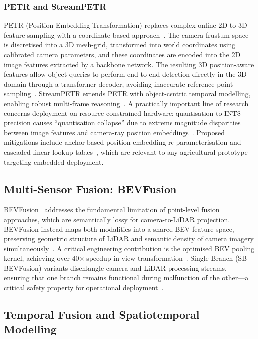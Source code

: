 \documentclass[12pt, a4paper]{article}
\begin{document}
\subsubsection{PETR and StreamPETR}

PETR (Position Embedding Transformation) replaces complex online 2D-to-3D feature
sampling with a coordinate-based approach~\cite{ref66, ref67}. The camera frustum space is
discretised into a 3D mesh-grid, transformed into world coordinates using calibrated
camera parameters, and these coordinates are encoded into the 2D image features extracted
by a backbone network. The resulting 3D position-aware features allow object queries to
perform end-to-end detection directly in the 3D domain through a transformer decoder,
avoiding inaccurate reference-point sampling~\cite{ref67}. StreamPETR extends PETR with
object-centric temporal modelling, enabling robust multi-frame reasoning~\cite{ref4, ref8, ref14, ref17}.
A practically important line of research concerns deployment on resource-constrained
hardware: quantisation to INT8 precision causes ``quantisation collapse'' due to extreme
magnitude disparities between image features and camera-ray position
embeddings~\cite{ref68, ref71}. Proposed mitigations include anchor-based position embedding
re-parameterisation and cascaded linear lookup tables~\cite{ref68, ref71}, which are
relevant to any agricultural prototype targeting embedded deployment.

\subsection{Multi-Sensor Fusion: BEVFusion}

BEVFusion~\cite{ref13, ref18} addresses the fundamental limitation of point-level fusion
approaches, which are semantically lossy for camera-to-LiDAR projection. BEVFusion instead
maps both modalities into a shared BEV feature space, preserving geometric structure of
LiDAR and semantic density of camera imagery simultaneously~\cite{ref13, ref59}. A critical
engineering contribution is the optimised BEV pooling kernel, achieving over 40$\times$
speedup in view transformation~\cite{ref13, ref18, ref60}. Single-Branch (SB-BEVFusion)
variants disentangle camera and LiDAR processing streams, ensuring that one branch remains
functional during malfunction of the other---a critical safety property for operational
deployment~\cite{ref63}.

\subsection{Temporal Fusion and Spatiotemporal Modelling}
\end{document}
